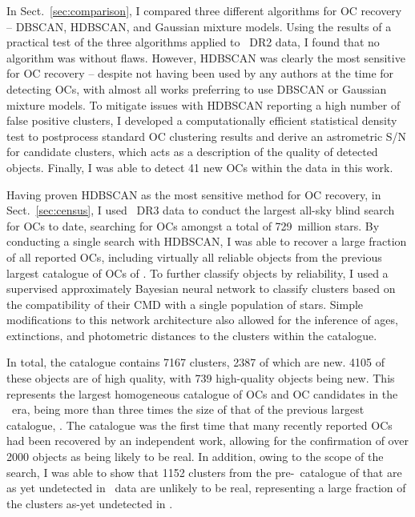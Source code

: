 In Sect.~\ref{sec:comparison}, I compared three different algorithms for OC recovery -- DBSCAN, HDBSCAN, and Gaussian mixture models. Using the results of a practical test of the three algorithms applied to \gaia\ DR2 data, I found that no algorithm was without flaws. However, HDBSCAN was clearly the most sensitive for OC recovery -- despite not having been used by any authors at the time for detecting OCs, with almost all works preferring to use DBSCAN or Gaussian mixture models. To mitigate issues with HDBSCAN reporting a high number of false positive clusters, I developed a computationally efficient statistical density test to postprocess standard OC clustering results and derive an astrometric S/N for candidate clusters, which acts as a description of the quality of detected objects. Finally, I was able to detect 41 new OCs within the data in this work. 

Having proven HDBSCAN as the most sensitive method for OC recovery, in Sect.~\ref{sec:census}, I used \gaia\ DR3 data to conduct the largest all-sky blind search for OCs to date, searching for OCs amongst a total of 729~million stars. By conducting a single search with HDBSCAN, I was able to recover a large fraction of all reported OCs, including virtually all reliable objects from the previous largest catalogue of OCs of \cite{cantat-gaudin_clusters_2020}. To further classify objects by reliability, I used a supervised approximately Bayesian neural network to classify clusters based on the compatibility of their CMD with a single population of stars. Simple modifications to this network architecture also allowed for the inference of ages, extinctions, and photometric distances to the clusters within the catalogue.

In total, the catalogue contains 7167 clusters, 2387 of which are new. 4105 of these objects are of high quality, with 739 high-quality objects being new. This represents the largest homogeneous catalogue of OCs and OC candidates in the \gaia\ era, being more than three times the size of that of the previous largest catalogue, \cite{cantat-gaudin_clusters_2020}. The catalogue was the first time that many recently reported OCs had been recovered by an independent work, allowing for the confirmation of over 2000 objects as being likely to be real. In addition, owing to the scope of the search, I was able to show that 1152 clusters from the pre-\gaia\ catalogue of \cite{kharchenko_global_2013} that are as yet undetected in \gaia\ data are unlikely to be real, representing a large fraction of the clusters as-yet undetected in \gaia.

